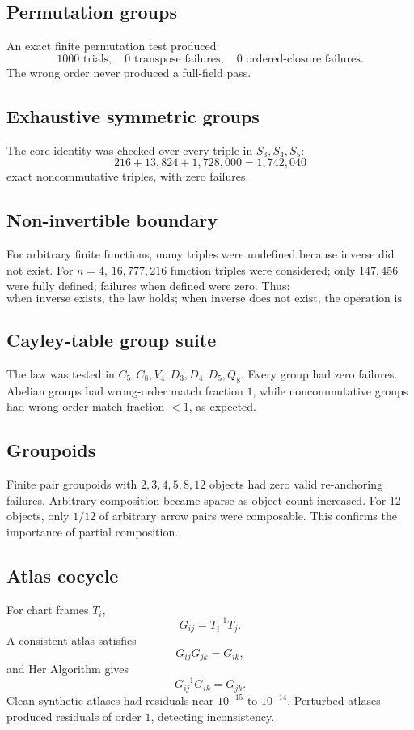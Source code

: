 \documentclass[11pt]{article}
\newcommand{\HA}{Her Algorithm}
\begin{document}
\subsection{Permutation groups}
An exact finite permutation test produced:
\[
1000\text{ trials},\quad 0\text{ transpose failures},\quad 0\text{ ordered-closure failures}.
\]
The wrong order never produced a full-field pass.

\subsection{Exhaustive symmetric groups}
The core identity was checked over every triple in \(S_3,S_4,S_5\):
\[
216+13{,}824+1{,}728{,}000=1{,}742{,}040
\]
exact noncommutative triples, with zero failures.

\subsection{Non-invertible boundary}
For arbitrary finite functions, many triples were undefined because inverse did not exist. For \(n=4\), \(16{,}777{,}216\) function triples were considered; only \(147{,}456\) were fully defined; failures when defined were zero. Thus:
\[
\boxed{\text{when inverse exists, the law holds; when inverse does not exist, the operation is generally undefined.}}
\]

\subsection{Cayley-table group suite}
The law was tested in \(C_5,C_8,V_4,D_3,D_4,D_5,Q_8\). Every group had zero failures. Abelian groups had wrong-order match fraction \(1\), while noncommutative groups had wrong-order match fraction \(<1\), as expected.

\subsection{Groupoids}
Finite pair groupoids with \(2,3,4,5,8,12\) objects had zero valid re-anchoring failures. Arbitrary composition became sparse as object count increased. For \(12\) objects, only \(1/12\) of arbitrary arrow pairs were composable. This confirms the importance of partial composition.

\subsection{Atlas cocycle}
For chart frames \(T_i\),
\[
G_{ij}=T_i^{-1}T_j.
\]
A consistent atlas satisfies
\[
G_{ij}G_{jk}=G_{ik},
\]
and \HA{} gives
\[
G_{ij}^{-1}G_{ik}=G_{jk}.
\]
Clean synthetic atlases had residuals near \(10^{-15}\) to \(10^{-14}\). Perturbed atlases produced residuals of order \(1\), detecting inconsistency.
\end{document}
